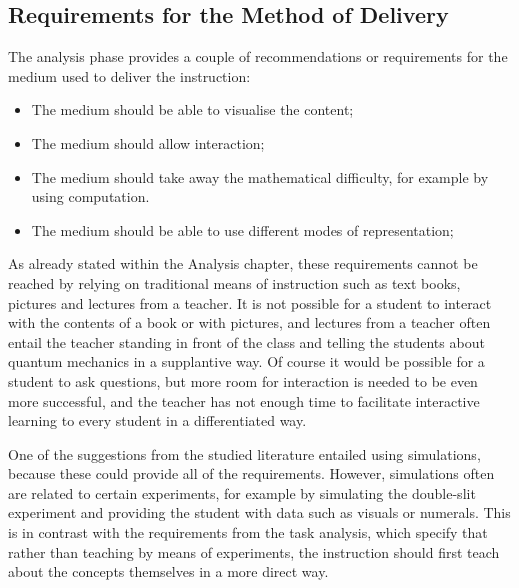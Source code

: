 \documentclass[11pt,twoside]{report} %
\begin{document}
\subsection{Requirements for the Method of Delivery}

The analysis phase provides a couple of recommendations or requirements for the medium used to deliver the instruction:

\begin{itemize}
\item The medium should be able to visualise the content;
\item The medium should allow interaction;
\item The medium should take away the mathematical difficulty, for example by using computation.
\item The medium should be able to use different modes of representation;
\end{itemize}

As already stated within the Analysis chapter, these requirements cannot be reached by relying on traditional means of instruction such as text books, pictures and lectures from a teacher. It is not possible for a student to interact with the contents of a book or with pictures, and lectures from a teacher often entail the teacher standing in front of the class and telling the students about quantum mechanics in a supplantive way. Of course it would be possible for a student to ask questions, but more room for interaction is needed to be even more successful, and the teacher has not enough time to facilitate interactive learning to every student in a differentiated way.

One of the suggestions from the studied literature entailed using simulations, because these could provide all of the requirements. However, simulations often are related to certain experiments, for example by simulating the double-slit experiment and providing the student with data such as visuals or numerals. This is in contrast with the requirements from the task analysis, which specify that rather than teaching by means of experiments, the instruction should first teach about the concepts themselves in a more direct way.
\end{document}
